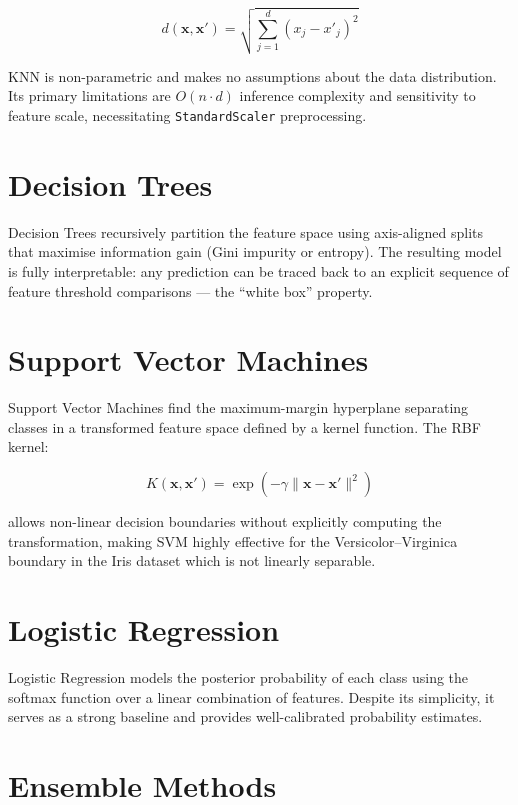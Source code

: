 \documentclass[12pt, a4paper]{report}
\newcommand{\code}[1]{\texttt{\small\textcolor{primary}{#1}}}
\begin{document}
\begin{equation}
  d(\mathbf{x}, \mathbf{x}') = \sqrt{\sum_{j=1}^{d}(x_j - x'_j)^2}
\end{equation}

KNN is non-parametric and makes no assumptions about the data distribution. Its primary
limitations are $O(n \cdot d)$ inference complexity and sensitivity to feature scale,
necessitating \code{StandardScaler} preprocessing.

\section{Decision Trees}

Decision Trees \cite{quinlan1986} recursively partition the feature space using
axis-aligned splits that maximise information gain (Gini impurity or entropy). The
resulting model is fully interpretable: any prediction can be traced back to an explicit
sequence of feature threshold comparisons — the ``white box'' property.

\section{Support Vector Machines}

Support Vector Machines \cite{vapnik1995} find the maximum-margin hyperplane separating
classes in a transformed feature space defined by a kernel function. The RBF kernel:

\begin{equation}
  K(\mathbf{x}, \mathbf{x}') = \exp\left(-\gamma \|\mathbf{x} - \mathbf{x}'\|^2\right)
\end{equation}

allows non-linear decision boundaries without explicitly computing the transformation,
making SVM highly effective for the Versicolor--Virginica boundary in the Iris dataset
which is not linearly separable.

\section{Logistic Regression}

Logistic Regression \cite{cox1958} models the posterior probability of each class using
the softmax function over a linear combination of features. Despite its simplicity, it
serves as a strong baseline and provides well-calibrated probability estimates.

\section{Ensemble Methods}
\end{document}
